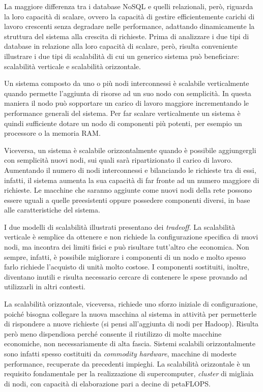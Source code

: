 La maggiore differenza tra i database NoSQL e quelli relazionali, però, riguarda la loro capacità di scalare, ovvero la capacità di gestire efficientemente carichi di lavoro 
crescenti senza degradare nelle performance, adattando dinamicamente la struttura del sistema alla crescita di richieste. Prima di analizzare i due tipi di database in relazione 
alla loro capacità di scalare, però, risulta conveniente illustrare i due tipi di scalabilità di cui un generico sistema può beneficiare: scalabilità verticale e scalabilità orizzontale.

Un sistema composto da uno o più nodi interconnessi è scalabile verticalmente quando permette l’aggiunta di risorse ad un suo nodo con semplicità. In questa maniera il nodo può 
sopportare un carico di lavoro maggiore incrementando le performance generali del sistema. Per far scalare verticalmente un sistema è quindi sufficiente dotare un nodo di componenti
più potenti, per esempio un processore o la memoria RAM.

Viceversa, un sistema è scalabile orizzontalmente quando è possibile aggiungergli con semplicità nuovi nodi, sui quali sarà ripartizionato il carico di lavoro. Aumentando il numero 
di nodi interconnessi e bilanciando le richieste tra di essi, infatti, il sistema aumenta la sua capacità di far fronte ad un numero maggiore di richieste. Le macchine che saranno 
aggiunte come nuovi nodi della rete possono essere uguali a quelle preesistenti oppure possedere componenti diversi, in base alle caratteristiche del sistema.

I due modelli di scalabilità illustrati presentano dei \textit{tradeoff}. La scalabilità verticale è semplice da ottenere e non richiede la configurazione specifica di nuovi nodi, ma incontra 
dei limiti fisici e può risultare tutt’altro che economica. Non sempre, infatti, è possibile migliorare i componenti di un nodo e molto spesso farlo richiede l’acquisto di unità 
molto costose. I componenti sostituiti, inoltre, diventano inutili e risulta necessario cercare di contenere le spese provando ad utilizzarli in altri contesti.

La scalabilità orizzontale, viceversa, richiede uno sforzo iniziale di configurazione, poiché bisogna collegare la nuova macchina al sistema in attività per permetterle di rispondere 
a nuove richieste (si pensi all’aggiunta di nodi per Hadoop). Risulta però meno dispendiosa perché consente il riutilizzo di molte macchine economiche, non necessariamente di alta 
fascia. Sistemi scalabili orizzontalmente sono infatti spesso costituiti da \textit{commodity hardware}, macchine di modeste performance, recuperate da precedenti impieghi. La scalabilità 
orizzontale è un requisito fondamentale per la realizzazione di supercomputer, \textit{cluster} di migliaia di nodi, con capacità di elaborazione pari a decine di petaFLOPS.

